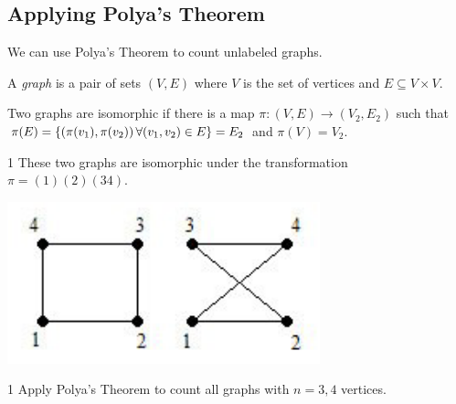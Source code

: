 \label{39-0514}
\subsection{Applying Polya's Theorem}
We can use Polya's Theorem to count unlabeled graphs. 

\begin{definition}
    A \emph{graph} is a pair of sets $(V, E)$ where $V$ is the set of vertices
    and $E \subseteq V \times V$. 
\end{definition}

\begin{definition}
    Two graphs are isomorphic if there is a map $\pi : (V, E) \to (V_2, E_2)$
    such that $\pi(E) = \left\{(\pi(v_1), \pi(v_2)) \, \forall (v_1, v_2) \in E\right\} = E_2$
     and $\pi(V) = V_2$. 
\end{definition}

\begin{example}1
    These two graphs are isomorphic under the transformation $\pi = (1)(2)(34)$.
    \begin{center}
        \includegraphics[scale=1]{figures/isomorphic_graphs.png}
    \end{center}
\end{example}

\begin{problem} 1
    Apply Polya's Theorem to count all graphs with $n = 3, 4$ vertices.
\end{problem}

